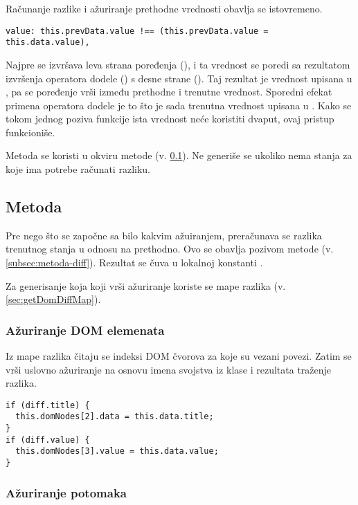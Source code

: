 Računanje razlike i ažuriranje prethodne vrednosti obavlja se istovremeno.

\begin{lstlisting}
value: this.prevData.value !== (this.prevData.value = this.data.value),
\end{lstlisting}

Najpre se izvršava leva strana poređenja (), i ta vrednost se poredi sa rezultatom izvršenja operatora dodele (\code{=}) s desne strane ().
Taj rezultat je vrednost upisana u , pa se poređenje vrši između prethodne i trenutne vrednost.
Sporedni efekat primena operatora dodele je to što je sada trenutna vrednost upisana u .
Kako se tokom jednog poziva funkcije  ista vrednost neće koristiti dvaput, ovaj pristup funkcioniše.

Metoda se koristi u okviru metode  (v. \cref{subsec:metoda-update}).
Ne generiše se ukoliko nema stanja za koje ima potrebe računati razliku.

\subsection{Metoda }
\label{subsec:metoda-update}

Pre nego što se započne sa bilo kakvim ažuiranjem, preračunava se razlika trenutnog stanja u odnosu na prethodno.
Ovo se obavlja pozivom metode  (v. \cref{subsec:metoda-diff}).
Rezultat se čuva u lokalnoj konstanti .

Za generisanje koja koji vrši ažuriranje koriste se mape razlika (v. \cref{sec:getDomDiffMap}).

\subsubsection{Ažuriranje DOM elemenata}

Iz mape razlika čitaju se indeksi DOM čvorova za koje su vezani povezi.
Zatim se vrši uslovno ažuriranje na osnovu imena svojstva iz klase i rezultata traženje razlika.

\begin{lstlisting}
if (diff.title) {
  this.domNodes[2].data = this.data.title;
}
if (diff.value) {
  this.domNodes[3].value = this.data.value;
}
\end{lstlisting}

\subsubsection{Ažuriranje potomaka}

